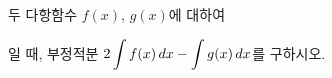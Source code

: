 두 다항함수 $f(x)$, $g(x)$에 대하여\par\smallskip{}\par\smallskip\noindent 일 때, 부정적분 $\displaystyle 2\int f(x)\mkern3mu dx-\int g(x)\mkern3mu dx$를 구하시오.
